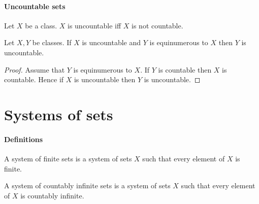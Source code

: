 \documentclass[../arithmetic.tex]{subfiles}
\begin{document}
  \paragraph{Uncountable sets}

  \begin{forthel}
    \begin{definition}
      Let $X$ be a class.
      $X$ is uncountable iff $X$ is not countable.
    \end{definition}
  \end{forthel}

  \begin{forthel}
    \begin{proposition}
      Let $X, Y$ be classes.
      If $X$ is uncountable and $Y$ is equinumerous to $X$ then $Y$ is
      uncountable.
    \end{proposition}
    \begin{proof}
      Assume that $Y$ is equinumerous to $X$.
      If $Y$ is countable then $X$ is countable.
      Hence if $X$ is uncountable then $Y$ is uncountable.
    \end{proof}
  \end{forthel}


  \section{Systems of sets}

  \paragraph{Definitions}

  \begin{forthel}
    \begin{definition}
      A system of finite sets is a system of sets $X$ such that every element of
      $X$ is finite.
    \end{definition}
  \end{forthel}

  \begin{forthel}
    \begin{definition}
      A system of countably infinite sets is a system of sets $X$ such that
      every element of $X$ is countably infinite.
    \end{definition}
  \end{forthel}
\end{document}
